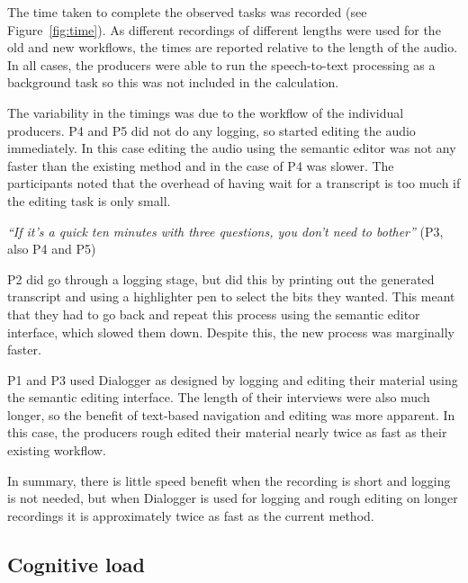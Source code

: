 The time taken to complete the observed tasks was recorded (see
Figure~\ref{fig:time}). As different recordings of different lengths were used
for the old and new workflows, the times are reported relative to the length of
the audio. In all cases, the producers were able to run the speech-to-text
processing as a background task so this was not included in the calculation.

The variability in the timings was due to the workflow of the individual
producers. P4 and P5 did not do any logging, so started editing the audio
immediately. In this case editing the audio using the semantic editor was not
any faster than the existing method and in the case of P4 was slower.
The participants noted that the overhead of having wait for a transcript is
too much if the editing task is only small.

\textit{``If it's a quick ten minutes with three questions, you don't need to
  bother''} (P3, also P4 and P5)

P2 did go through a logging stage, but did this by printing out the generated
transcript and using a highlighter pen to select the bits they wanted. This
meant that they had to go back and repeat this process using the semantic
editor interface, which slowed them down. Despite this, the new process was
marginally faster.

P1 and P3 used Dialogger as designed by logging and editing their material
using the semantic editing interface. The length of their interviews were also
much longer, so the benefit of text-based navigation and editing was more
apparent. In this case, the producers rough edited their material nearly twice
as fast as their existing workflow.

In summary, there is little speed benefit when the recording is short and
logging is not needed, but when Dialogger is used for logging
and rough editing on longer recordings it is approximately twice as fast as the
current method.

\subsection{Cognitive load}


